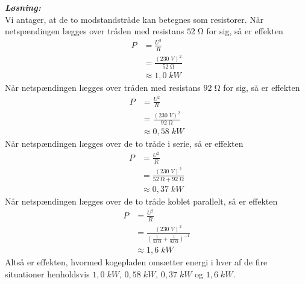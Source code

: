 \documentclass{report}
\newcommand{\sol}{\setlength{\parindent}{0cm}\textbf{\textit{Løsning:}}\setlength{\parindent}{1cm}}
\begin{document}
\sol \\
Vi antager, at de to modstandstråde kan betegnes som resistorer.
Når netspændingen lægges over tråden med resistans $52 \;\unit{\ohm} $ for sig, så er effekten
\begin{equation*}
\begin{split}
  P&=\frac{U^2}{R}\\ 
  &=\frac{\left(230 \;\unit{V} \right)^2}{52 \;\unit{\ohm} }\\ 
  &\approx 1,0 \;\unit{kW} 
\end{split}
\end{equation*}
Når netspændingen lægges over tråden med resistans $92 \;\unit{\ohm} $ for sig, så er effekten
\begin{equation*}
\begin{split}
  P&=\frac{U^2}{R}\\ 
  &=\frac{\left(230 \;\unit{V} \right)^2}{92 \;\unit{\ohm} }\\ 
  &\approx 0,58 \;\unit{kW} 
\end{split}
\end{equation*}
Når netspændingen lægges over de to tråde i serie, så er effekten
\begin{equation*}
\begin{split}
P&=\frac{U^2}{R}\\ 
&=\frac{\left(230 \;\unit{V} \right)^2}{52 \;\unit{\ohm} + 92 \;\unit{\ohm} }\\ 
  &\approx 0,37 \;\unit{kW} 
\end{split}
\end{equation*}
Når netspændingen lægges over de to tråde koblet parallelt, så er effekten
\begin{equation*}
\begin{split}
P&=\frac{U^2}{R}\\ 
  &=\frac{\left(230 \;\unit{V} \right)^2 }{\left(\frac{1}{52 \;\unit{\ohm} }+\frac{1}{92 \;\unit{\ohm} }\right)^{-1}}\\ 
  &\approx 1,6 \;\unit{kW} 
\end{split}
\end{equation*}
Altså er effekten, hvormed kogepladen omsætter energi i hver af de fire situationer henholdsvis $1,0 \;\unit{kW} $, $0,58 \;\unit{kW} $, $0,37 \;\unit{kW} $ og $1,6 \;\unit{kW} $. 
\end{document}
